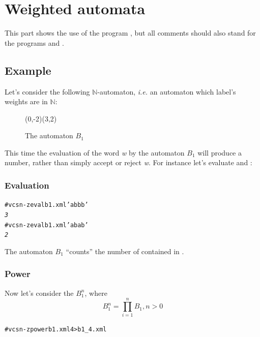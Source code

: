 \section{Weighted automata}

This part shows the use of the program , but all
comments should also stand for the programs
 and .

\subsection{Example}

Let's consider the following $\mathbb{N}$-automaton, \textit{i.e.}
an automaton which label's weights are in $\mathbb{N}$:

\begin{figure}[ht] \centering
  \begin{VCPicture}{(0,-2)(3,2)}
     
     
     
     
  \end{VCPicture}
  \caption{The automaton $B_1$}
\end{figure}

This time the evaluation of the word \textit{w} by the automaton $B_1$
will produce a number, rather than simply accept or reject \textit{w}.
For instance let's evaluate  and :

\subsubsection{Evaluation}

\begin{alltt}
# vcsn-z eval b1.xml 'abbb'
\textit{3}
# vcsn-z eval b1.xml 'abab'
\textit{2}
\end{alltt}

The automaton $B_1$ ``counts'' the number of  contained in
.

\subsubsection{Power}

Now let's consider the $B_1^n$, where
$$B_1^n = \prod_{i=1}^n B_1, n > 0$$

\begin{alltt}
# vcsn-z power b1.xml 4 > b1_4.xml
\end{alltt}

